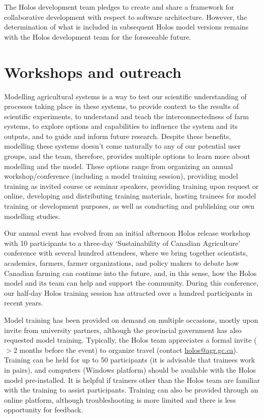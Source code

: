 The Holos development team pledges to create and share a framework for
collaborative development with respect to software architecture. However, the
determination of what is included in subsequent Holos model versions remains
with the Holos development team for the foreseeable future.

\section{Workshops and outreach}
\label{sec:workshops}

Modelling agricultural systems is a way to test our scientific understanding of
processes taking place in these systems, to provide context to the results of
scientific experiments, to understand and teach the interconnectedness of farm
systems, to explore options and capabilities to influence the system and its
outputs, and to guide and inform future research. Despite these benefits,
modelling these systems doesn't come naturally to any of our potential user
groups, and the team, therefore, provides multiple options to learn more about
modelling and the model. These options range from organizing an annual
workshop/conference (including a model training session), providing model
training as invited course or seminar speakers, providing training upon request
or online, developing and distributing training materials, hosting trainees for
model training or development purposes, as well as conducting and publishing our
own modelling studies.

Our annual event has evolved from an initial afternoon Holos release workshop
with 10 participants to a three-day `Sustainability of Canadian Agriculture'
conference with several hundred attendees, where we bring together scientists,
academics, farmers, farmer organizations, and policy makers to debate how
Canadian farming can continue into the future, and, in this sense, how the
Holos model and its team can help and support the community. During this
conference, our half-day Holos training session has attracted over a hundred
participants in recent years.

Model training has been provided on demand on multiple occasions, mostly upon
invite from university partners, although the provincial government has also
requested model training. Typically, the Holos team appreciates a formal invite
($>$2 months before the event) to organize travel (contact
\href{mailto:holos@agr.gc.ca}{holos@agr.gc.ca}). Training can be held for up
to 50 participants (it is advisable that trainees work in pairs), and computers
(Windows platform) should be available with the Holos model pre-installed. It
is helpful if trainers other than the Holos team are familiar with the training
to assist participants. Training can also be provided through an online platform,
although troubleshooting is more limited and there is less opportunity for
feedback.

